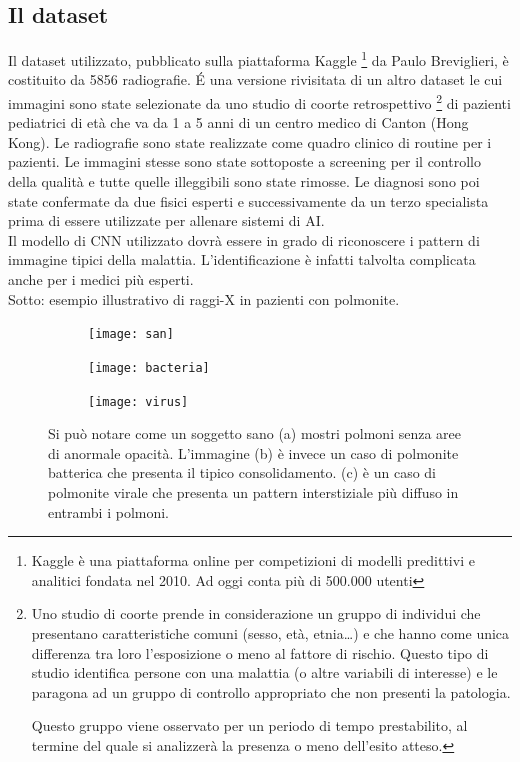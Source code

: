 \subsection{Il dataset}
Il dataset utilizzato,
 pubblicato sulla piattaforma Kaggle \footnote{Kaggle è una piattaforma online per competizioni di modelli predittivi e analitici fondata nel 2010. Ad oggi conta più di 500.000 utenti} da Paulo Breviglieri, è costituito da 5856 radiografie.
 É una versione rivisitata di un altro dataset le cui immagini sono state selezionate da uno studio di coorte retrospettivo \footnote{Uno studio di coorte prende in considerazione un gruppo di individui che presentano caratteristiche comuni (sesso, età, etnia…) e che hanno come unica differenza tra loro l’esposizione o meno al fattore di rischio. Questo tipo di studio identifica persone con una malattia (o altre variabili di interesse) e le paragona ad un gruppo di controllo appropriato che non presenti la patologia.

 Questo gruppo viene osservato per un periodo di tempo prestabilito, al termine del quale si analizzerà la presenza o meno dell’esito atteso.} di pazienti pediatrici di età che va da 1 a 5 anni di un centro medico di Canton (Hong Kong). Le radiografie sono state realizzate come quadro clinico di routine per i pazienti. Le immagini stesse sono state sottoposte a screening per il controllo della qualità e tutte quelle illeggibili sono state rimosse. Le diagnosi sono poi state confermate da due fisici esperti e successivamente da un terzo specialista prima di essere utilizzate per allenare sistemi di AI. \\
 Il modello di CNN utilizzato dovrà essere in grado di riconoscere i pattern di immagine tipici della malattia. L’identificazione è infatti talvolta complicata anche per i medici più esperti. \\
Sotto: esempio illustrativo di raggi-X in pazienti con polmonite. 
\begin{figure}[hb!]
\begin{subfigure}{.32\textwidth}
  \centering
  \texttt{[image: san]}
  \caption{}
  \label{fig:snap1}
\end{subfigure}%
\begin{subfigure}{.32\textwidth}
  \centering
  \texttt{[image: bacteria]}
  \caption{}
  \label{fig:snap2}
\end{subfigure}%
\begin{subfigure}{.32\textwidth}
  \centering
  \texttt{[image: virus]}
  \caption{}
  \label{fig:snap3}
\end{subfigure}
\caption{Si può notare come un soggetto sano (a) mostri polmoni senza aree di anormale opacità. L’immagine (b) è invece un caso di polmonite batterica che presenta il tipico consolidamento. (c) è un caso di polmonite virale che presenta un pattern interstiziale più diffuso in entrambi i polmoni.}
\label{fig:fig}
\end{figure} 

